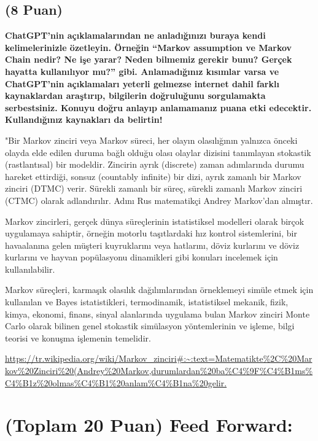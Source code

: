 \documentclass[11pt]{article}
\begin{document}
\subsection{(8 Puan)} \textbf{ChatGPT’nin açıklamalarından ne anladığınızı buraya kendi kelimelerinizle özetleyin. Örneğin ``Markov assumption ve Markov Chain nedir? Ne işe yarar? Neden bilmemiz gerekir bunu? Gerçek hayatta kullanılıyor mu?'' gibi. Anlamadığınız kısımlar varsa ve ChatGPT’nin açıklamaları yeterli gelmezse internet dahil farklı kaynaklardan araştırıp, bilgilerin doğruluğunu sorgulamakta serbestsiniz. Konuyu doğru anlayıp anlamamanız puana etki edecektir. Kullandığınız kaynakları da belirtin!}

"Bir Markov zinciri veya Markov süreci, her olayın olasılığının yalnızca önceki olayda elde edilen duruma bağlı olduğu olası olaylar dizisini tanımlayan stokastik (rastlantısal) bir modeldir. Zincirin ayrık (discrete) zaman adımlarında durumu hareket ettirdiği, sonsuz (countably infinite) bir dizi, ayrık zamanlı bir Markov zinciri (DTMC) verir. Sürekli zamanlı bir süreç, sürekli zamanlı Markov zinciri (CTMC) olarak adlandırılır. Adını Rus matematikçi Andrey Markov'dan almıştır.

Markov zincirleri, gerçek dünya süreçlerinin istatistiksel modelleri olarak birçok uygulamaya sahiptir, örneğin motorlu taşıtlardaki hız kontrol sistemlerini, bir havaalanına gelen müşteri kuyruklarını veya hatlarını, döviz kurlarını ve döviz kurlarını ve hayvan popülasyonu dinamikleri gibi konuları incelemek için kullanılabilir.

Markov süreçleri, karmaşık olasılık dağılımlarından örneklemeyi simüle etmek için kullanılan ve Bayes istatistikleri, termodinamik, istatistiksel mekanik, fizik, kimya, ekonomi, finans, sinyal alanlarında uygulama bulan Markov zinciri Monte Carlo olarak bilinen genel stokastik simülasyon yöntemlerinin  ve işleme, bilgi teorisi ve konuşma işlemenin temelidir.

\url{https://tr.wikipedia.org/wiki/Markov_zinciri#:~:text=Matematikte%2C%20Markov%20Zinciri%20(Andrey%20Markov,durumlardan%20ba%C4%9F%C4%B1ms%C4%B1z%20olmas%C4%B1%20anlam%C4%B1na%20gelir.}

\section{(Toplam 20 Puan) Feed Forward:}
 
\end{document}
